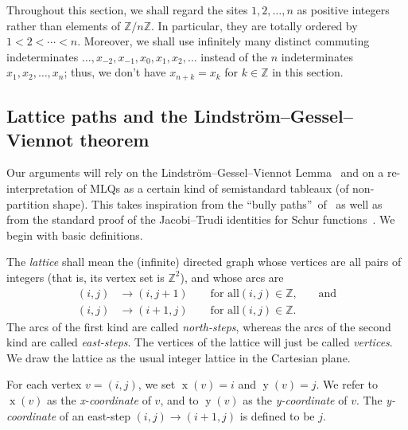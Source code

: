 \documentclass[reqno]{amsart}%
\newcommand{\0}{\phantom{c}}
\newcommand{\defn}[1]{{\color{darkred}\emph{#1}}}
\theoremstyle{plain}
\theoremstyle{definition}
\numberwithin{equation}{section}
\begin{document}
Throughout this section, we shall regard the sites $1,2,\ldots,n$ as positive
integers rather than elements of $\mathbb{Z}/n\mathbb{Z}$. In particular, they
are totally ordered by $1<2<\cdots<n$. Moreover, we shall use infinitely many
distinct commuting indeterminates $\ldots,x_{-2},x_{-1},x_{0},x_{1}%
,x_{2},\ldots$ instead of the $n$ indeterminates $x_{1},x_{2},\ldots,x_{n}$;
thus, we don't have $x_{n+k}=x_{k}$ for $k\in\mathbb{Z}$ in this section.

\subsection{Lattice paths and the Lindstr\"{o}m--Gessel--Viennot theorem}

Our arguments will rely on the Lindstr\"om--Gessel--Viennot
Lemma~\cite{GV85,Lindstrom73} and on a re-interpretation of MLQs as a certain
kind of semistandard tableaux (of non-partition shape). This takes inspiration
from the \textquotedblleft bully paths\textquotedblright\ of~\cite{AasLin17}
as well as from the standard proof of the Jacobi--Trudi identities for Schur
functions~\cite[First proof of Theorem 7.16.1]{Stanley-EC2}. We begin with
basic definitions.

The \defn{lattice} shall mean the (infinite) directed graph whose vertices are
all pairs of integers (that is, its vertex set is $\mathbb{Z}^{2}$), and whose
arcs are
\begin{align*}
\left(  i,j\right)   &  \rightarrow\left(  i,j+1\right)  \qquad\text{for all
}\left(  i,j\right)  \in\mathbb{Z}\text{,}\qquad\text{and}\\
\left(  i,j\right)   &  \rightarrow\left(  i+1,j\right)  \qquad\text{for all
}\left(  i,j\right)  \in\mathbb{Z}\text{.}%
\end{align*}
The arcs of the first kind are called \defn{north-steps}, whereas the arcs of
the second kind are called \defn{east-steps}. The vertices of the lattice will
just be called \defn{vertices}. We draw the lattice as the usual integer
lattice in the Cartesian plane.

For each vertex $v=\left(  i,j\right)  $, we set $\operatorname*{x}\left(
v\right)  =i$ and $\operatorname*{y}\left(  v\right)  =j$. We refer to
$\operatorname*{x}\left(  v\right)  $ as the \defn{x-coordinate} of $v$, and
to $\operatorname*{y}\left(  v\right)  $ as the \defn{y-coordinate} of $v$.
The \defn{y-coordinate} of an east-step $\left(  i,j\right)  \rightarrow
\left(  i+1,j\right)  $ is defined to be $j$.
\end{document}
